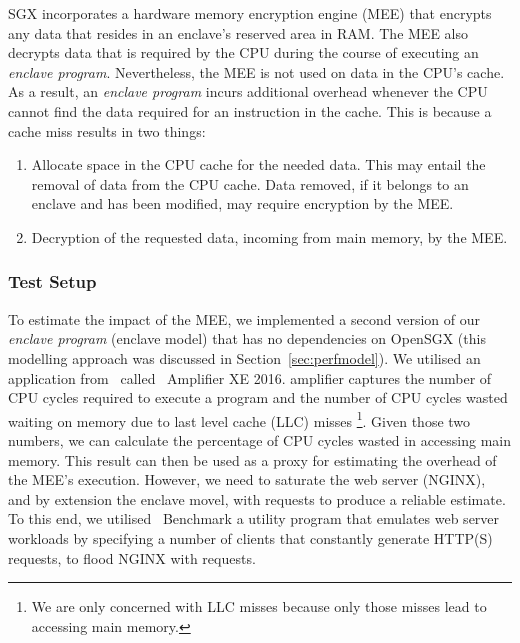 \documentclass[../../../main.tex]{subfiles}
\begin{document}
SGX incorporates a hardware memory encryption engine (MEE) that
encrypts any data that resides in an enclave's reserved area in RAM.
The MEE also decrypts data that is required by the CPU during the
course of executing an \textit{enclave program}. Nevertheless, the MEE
is not used on data in the CPU's cache. As a result, an
\textit{enclave program} incurs additional overhead whenever the CPU
cannot find the data required for an instruction in the cache. This is
because a cache miss results in two things:
\begin{enumerate}
  \item Allocate space in the CPU cache for the needed data. This may entail
    the removal of data from the CPU cache. Data removed, if it belongs
    to an enclave and has been modified, may require encryption by the MEE.
  \item Decryption of the requested data, incoming from main memory, by the MEE.
\end{enumerate}

\subsubsection*{Test Setup}
To estimate the impact of the MEE, we implemented a second version of
our \textit{enclave program} (enclave model) that has no dependencies
on OpenSGX (this modelling approach was discussed in
Section~\ref{sec:perfmodel}). We utilised an application from
\Intel~called \VTune~Amplifier XE 2016. \VTune amplifier captures the
number of CPU cycles required to execute a program and the number of
CPU cycles wasted waiting on memory due to last level cache (LLC)
misses \footnote{We are only concerned with LLC misses because only
  those misses lead to accessing main memory.}. Given those two
numbers, we can calculate the percentage of CPU cycles wasted in
accessing main memory. This result can then be used as a proxy for
estimating the overhead of the MEE's execution. However, we need to
saturate the web server (NGINX), and by extension the enclave movel,
with requests to produce a reliable estimate. To this end, we utilised
\Apache~Benchmark a utility program that emulates web server workloads
by specifying a number of clients that constantly generate HTTP(S)
requests, to flood NGINX with requests.
\end{document}
